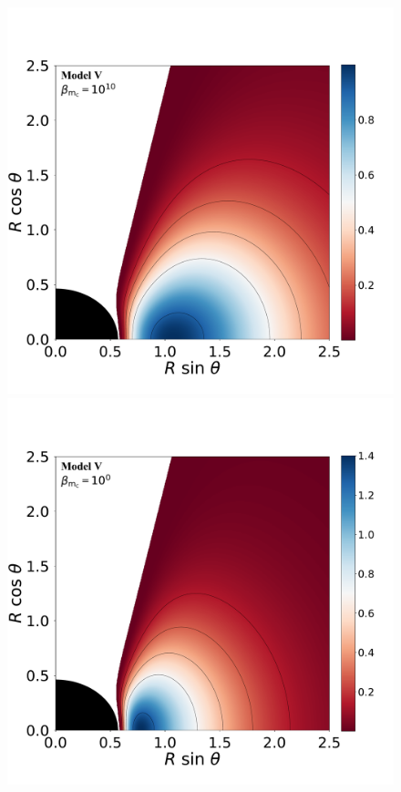 \documentclass[twocolumn,aps,showpacs,showkeys,prd,superscriptaddress,byrevtex, amsmath]{revtex4-1}
\begin{document}
\begin{figure}
\centering
\includegraphics[scale=0.14]{figures/fig4_V_10.pdf}
\hspace{-0.3cm}
\includegraphics[scale=0.14]{figures/fig4_V_1.pdf}

\end{figure}
\end{document}
